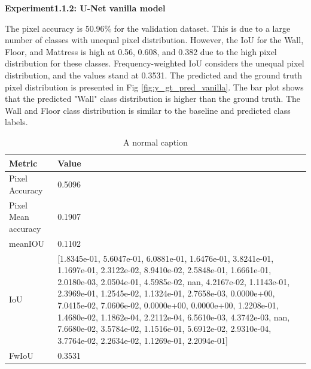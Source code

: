	{ \bf Experiment1.1.2: U-Net vanilla model}
	
	The pixel accuracy is 50.96\% for the validation dataset. This is due to a large number of classes with unequal pixel distribution. However, the IoU for the Wall, Floor, and Mattress is high at 0.56, 0.608, and 0.382 due to the high pixel distribution for these classes. Frequency-weighted IoU considers the unequal pixel distribution, and the values stand at 0.3531. The predicted and the ground truth pixel distribution is presented in Fig \ref{fig:y_gt_pred_vanilla}. The bar plot shows that the predicted "Wall" class distribution is higher than the ground truth. The Wall and Floor class distribution is similar to the baseline and predicted class labels. 
    
   	
   	\begin{table}
    \begin{center}
    	\begin{tabular}{ | l | p{12cm} |}
    		\hline
    		
    		\cellcolor{purple!30}Metric & \cellcolor{purple!30}Value \\ \hline
    		Pixel Accuracy & 0.5096 \\ \hline
    		Pixel Mean accuracy & 0.1907  \\ \hline
    		meanIOU & 0.1102 \\ \hline
    		IoU & [1.8345e-01, 5.6047e-01, 6.0881e-01, 1.6476e-01, 3.8241e-01, 1.1697e-01, 
    		2.3122e-02, 8.9410e-02, 2.5848e-01, 1.6661e-01, 2.0180e-03, 2.0504e-01, 
    		4.5985e-02,        nan, 4.2167e-02, 1.1143e-01, 2.3969e-01, 1.2545e-02, 
    		1.1324e-01, 2.7658e-03, 0.0000e+00, 7.0415e-02, 7.0606e-02, 0.0000e+00,  
    		0.0000e+00, 1.2208e-01, 1.4680e-02, 1.1862e-04, 2.2112e-04, 6.5610e-03, 
    		4.3742e-03,        nan, 7.6680e-02, 3.5784e-02, 1.1516e-01, 5.6912e-02, 
    		2.9310e-04, 3.7764e-02, 2.2634e-02, 1.1269e-01, 2.2094e-01] \\ \hline
    		FwIoU & 0.3531 \\ \hline
    		\hline
    	\end{tabular}
   		\caption{A normal caption}
	    \label{tab:caption}
    \end{center}
	\end{table}

